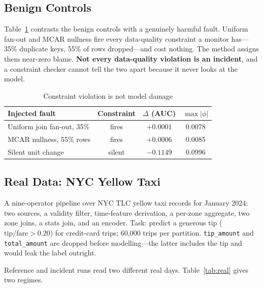 \documentclass[conference]{IEEEtran}
\begin{document}
\subsection{Benign Controls}

Table~\ref{tab:benign} contrasts the benign controls with a genuinely harmful
fault. Uniform fan-out and MCAR nullness fire every data-quality constraint a
monitor has---35\% duplicate keys, 55\% of rows dropped---and cost nothing. The
method assigns them near-zero blame.
\textbf{Not every data-quality violation is an incident}, and a constraint
checker cannot tell the two apart because it never looks at the model.

\begin{table}[t]
\caption{Constraint violation is not model damage}
\label{tab:benign}
\centering
\begin{tabular}{lccc}
\toprule
Injected fault & Constraint & $\Delta$ (AUC) & $\max|\phi|$ \\
\midrule
Uniform join fan-out, 35\% & fires & $+0.0001$ & 0.0078 \\
MCAR nullness, 55\% rows   & fires & $+0.0006$ & 0.0085 \\
Silent unit change         & silent & $-0.1149$ & 0.0996 \\
\bottomrule
\end{tabular}
\end{table}

\subsection{Real Data: NYC Yellow Taxi}\label{sec:real}

A nine-operator pipeline over NYC TLC yellow taxi records for January 2024: two
sources, a validity filter, time-feature derivation, a per-zone aggregate, two
zone joins, a stats join, and an encoder. Task: predict a generous tip
($\text{tip}/\text{fare} > 0.20$) for credit-card trips; 60{,}000 trips per
partition. \texttt{tip\_amount} and \texttt{total\_amount} are dropped before
modelling---the latter includes the tip and would leak the label outright.

Reference and incident runs read two different real days. Table~\ref{tab:real}
gives two regimes.
\end{document}
